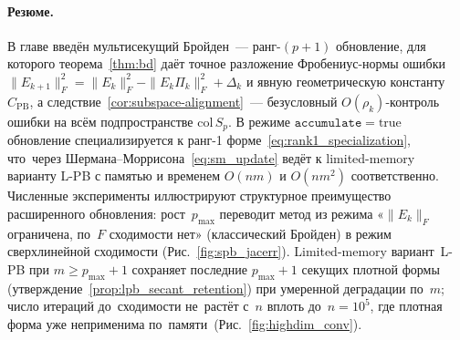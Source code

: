 \paragraph{Резюме.}
В главе введён мультисекущий Бройден~--- ранг-$(p{+}1)$
обновление, для которого теорема~\ref{thm:bd} даёт точное разложение
Фробениус-нормы ошибки $\|E_{k+1}\|_F^2 = \|E_k\|_F^2 - \|E_k\Pi_k\|_F^2
+ \Delta_k$ и явную геометрическую константу $C_{\mathrm{PB}}$, а
следствие~\ref{cor:subspace-alignment}~--- безусловный $O(\rho_k)$-контроль
ошибки на всём подпространстве $\mathrm{col}\,S_p$. В режиме
$\mathtt{accumulate}=\text{true}$ обновление специализируется к ранг-1
форме~\eqref{eq:rank1_specialization}, что~через
Шермана--Моррисона~\eqref{eq:sm_update} ведёт к limited-memory варианту
L-PB с памятью и временем $O(nm)$ и $O(nm^2)$ соответственно.
Численные эксперименты иллюстрируют структурное преимущество
расширенного обновления: рост~$p_{\max}$ переводит метод из режима
«$\|E_k\|_F$ ограничена, по~$F$ сходимости нет» (классический Бройден)
в режим сверхлинейной сходимости (Рис.~\ref{fig:spb_jacerr}).
Limited-memory вариант~L-PB при $m\ge p_{\max}+1$ сохраняет последние
$p_{\max}+1$ секущих плотной формы
(утверждение~\ref{prop:lpb_secant_retention}) при умеренной деградации
по~$m$; число итераций до~сходимости не~растёт с~$n$ вплоть до~$n=10^5$,
где плотная форма уже неприменима по~памяти~(Рис.~\ref{fig:highdim_conv}).


